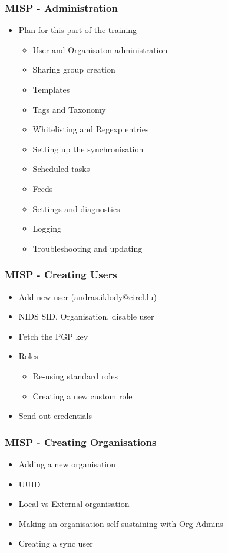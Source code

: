 \begin{frame}
    \frametitle{MISP - Administration}
    \begin{itemize}
    \item Plan for this part of the training
        \begin{itemize}
            \item User and Organisaton administration
            \item Sharing group creation
            \item Templates
            \item Tags and Taxonomy
            \item Whitelisting and Regexp entries
            \item Setting up the synchronisation
            \item Scheduled tasks
            \item Feeds
            \item Settings and diagnostics
            \item Logging
            \item Troubleshooting and updating
        \end{itemize}
    \end{itemize}
\end{frame}

\begin{frame}
    \frametitle{MISP - Creating Users}
        \begin{itemize}
            \item Add new user (andras.iklody@circl.lu)
            \item NIDS SID, Organisation, disable user
            \item Fetch the PGP key
            \item Roles
            \begin{itemize}
                \item Re-using standard roles
                \item Creating a new custom role
            \end{itemize}
            \item Send out credentials
        \end{itemize}
\end{frame}

\begin{frame}
    \frametitle{MISP - Creating Organisations}
        \begin{itemize}
            \item Adding a new organisation
            \item UUID
            \item Local vs External organisation
            \item Making an organisation self sustaining with Org Admins
            \item Creating a sync user
        \end{itemize}
\end{frame}


